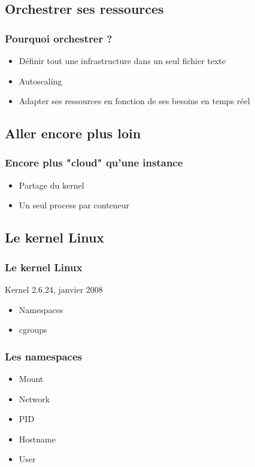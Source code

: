 \subsection[Orchestration]{Orchestrer ses ressources}

  \begin{frame}
    \frametitle{Pourquoi orchestrer ?}
    \begin{itemize}
      \item Définir tout une infrastructure dans un seul fichier texte
      \item Autoscaling
        \item Adapter ses ressources en fonction de ses besoins en temps réel
    \end{itemize}
  \end{frame}

  \subsection[Conteneurs]{Aller encore plus loin}

  \begin{frame}
    \frametitle{Encore plus "cloud" qu'une instance}
    \begin{itemize}
      \item Partage du kernel
      \item Un seul process par conteneur
    \end{itemize}
  \end{frame}

\subsection[Conteneurs]{Le kernel Linux}

  \begin{frame}
    \frametitle{Le kernel Linux}
    \begin{itemize}
        Kernel 2.6.24, janvier 2008
      \begin{itemize}
        \item Namespaces
        \item cgroups
      \end{itemize}
    \end{itemize}
  \end{frame}

 \begin{frame}
     \frametitle{Les namespaces}
    \begin{itemize}
      \item Mount
      \item Network
      \item PID
      \item Hostname
      \item User
    \end{itemize}
  \end{frame}

